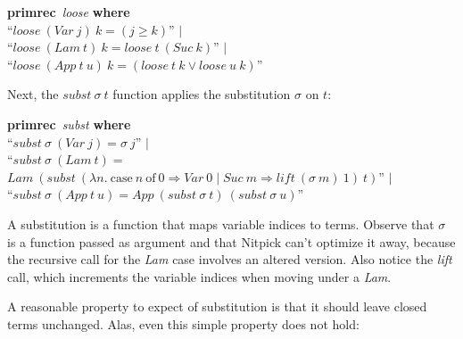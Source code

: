\documentclass[a4paper,12pt]{article}
\renewcommand\_{\hbox{\textunderscore\kern-.05ex}}
\begin{document}
\prew
\textbf{primrec}~\textit{loose} \textbf{where} \\
``$\textit{loose}~(\textit{Var}~j)~k = (j \ge k)$'' $\mid$ \\
``$\textit{loose}~(\textit{Lam}~t)~k = \textit{loose}~t~(\textit{Suc}~k)$'' $\mid$ \\
``$\textit{loose}~(\textit{App}~t~u)~k = (\textit{loose}~t~k \mathrel{\lor} \textit{loose}~u~k)$''
\postw

Next, the $\textit{subst}~\sigma~t$ function applies the substitution $\sigma$
on $t$:

\prew
\textbf{primrec}~\textit{subst} \textbf{where} \\
``$\textit{subst}~\sigma~(\textit{Var}~j) = \sigma~j$'' $\mid$ \\
``$\textit{subst}~\sigma~(\textit{Lam}~t) = {}$\phantom{''} \\
\phantom{``}$\textit{Lam}~(\textit{subst}~(\lambda n.\> \textrm{case}~n~\textrm{of}~0 \Rightarrow \textit{Var}~0 \mid \textit{Suc}~m \Rightarrow \textit{lift}~(\sigma~m)~1)~t)$'' $\mid$ \\
``$\textit{subst}~\sigma~(\textit{App}~t~u) = \textit{App}~(\textit{subst}~\sigma~t)~(\textit{subst}~\sigma~u)$''
\postw

A substitution is a function that maps variable indices to terms. Observe that
$\sigma$ is a function passed as argument and that Nitpick can't optimize it
away, because the recursive call for the \textit{Lam} case involves an altered
version. Also notice the \textit{lift} call, which increments the variable
indices when moving under a \textit{Lam}.

A reasonable property to expect of substitution is that it should leave closed
terms unchanged. Alas, even this simple property does not hold:
\end{document}
